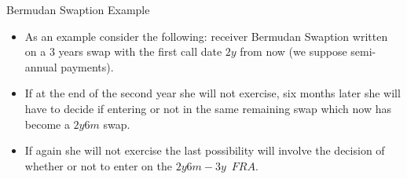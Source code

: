 \documentclass{beamer}
\begin{document}
\begin{frame}{Bermudan Swaption Example}
\begin{itemize}
	\item<1-> As an example consider the following: receiver Bermudan Swaption written on a 3 years swap with the first call date $2y$ from now (we suppose semi-annual payments).
	\item<2-> If at the end of the second year she will not exercise, six months later she will have to decide if entering or not in the same remaining swap which now has become a $2y6m$ swap.
	\item<3-> If again she will not exercise the last possibility will involve the decision of whether or not to enter on the $2y6m-3y$~$FRA$.
\end{itemize}
\end{frame}		

\end{document}

